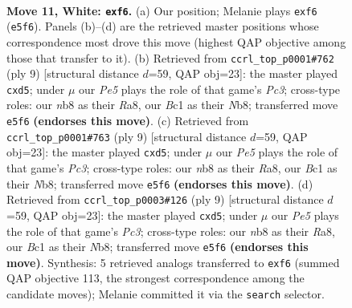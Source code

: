 \documentclass[11pt]{article}
\begin{document}
\clearpage

\begin{figure}[p]\centering
\begin{subfigure}{0.46\textwidth}\centering
\resizebox{\linewidth}{!}{%
\newchessgame
\chessboard[
  setfen={rnbqkb1r/ppp1p3/1n3pp1/3pP1Np/P2P4/NB6/1PP2PPP/R1BQ1RK1 w kq - 0 11},
  showmover=false,
  pgfstyle=straightmove, color=movearrow, markmove={e5-f6}
]}
\caption{}
\end{subfigure}\hfill
\begin{subfigure}{0.46\textwidth}\centering
\resizebox{\linewidth}{!}{%
\newchessgame
\chessboard[
  setfen={rn1qkb1r/pp2pppp/2p2n2/3P1b2/3P4/4PN2/PP3PPP/RNBQKB1R b KQkq - 0 5},
  showmover=false,
  pgfstyle=straightmove, color=movearrow, markmove={c6-d5}
]}
\caption{}
\end{subfigure}
\\[4pt]
\begin{subfigure}{0.46\textwidth}\centering
\resizebox{\linewidth}{!}{%
\newchessgame
\chessboard[
  setfen={rn1qkb1r/pp2pppp/2p2n2/3P1b2/3P4/4PN2/PP3PPP/RNBQKB1R b KQkq - 0 5},
  showmover=false,
  pgfstyle=straightmove, color=movearrow, markmove={c6-d5}
]}
\caption{}
\end{subfigure}\hfill
\begin{subfigure}{0.46\textwidth}\centering
\resizebox{\linewidth}{!}{%
\newchessgame
\chessboard[
  setfen={rn1qkb1r/pp2pppp/2p2n2/3P1b2/3P4/4PN2/PP3PPP/RNBQKB1R b KQkq - 0 5},
  showmover=false,
  pgfstyle=straightmove, color=movearrow, markmove={c6-d5}
]}
\caption{}
\end{subfigure}
\caption{\textbf{Move 11, White: \texttt{exf6}.} (a) Our position; Melanie plays \texttt{exf6} (\texttt{e5f6}). Panels (b)--(d) are the retrieved master positions whose correspondence most drove this move (highest QAP objective among those that transfer to it). (b) Retrieved from \texttt{ccrl\_top\_p0001\#762} (ply 9) [structural distance $d$=59, QAP obj=23]: the master played \texttt{cxd5}; under $\mu$ our \emph{Pe5} plays the role of that game's \emph{Pc3}; cross-type roles: our \emph{n}b8 as their \emph{R}a8, our \emph{B}c1 as their \emph{N}b8; transferred move \texttt{e5f6} \textbf{(endorses this move)}. (c) Retrieved from \texttt{ccrl\_top\_p0001\#763} (ply 9) [structural distance $d$=59, QAP obj=23]: the master played \texttt{cxd5}; under $\mu$ our \emph{Pe5} plays the role of that game's \emph{Pc3}; cross-type roles: our \emph{n}b8 as their \emph{R}a8, our \emph{B}c1 as their \emph{N}b8; transferred move \texttt{e5f6} \textbf{(endorses this move)}. (d) Retrieved from \texttt{ccrl\_top\_p0003\#126} (ply 9) [structural distance $d$=59, QAP obj=23]: the master played \texttt{cxd5}; under $\mu$ our \emph{Pe5} plays the role of that game's \emph{Pc3}; cross-type roles: our \emph{n}b8 as their \emph{R}a8, our \emph{B}c1 as their \emph{N}b8; transferred move \texttt{e5f6} \textbf{(endorses this move)}. Synthesis: 5 retrieved analogs transferred to \texttt{exf6} (summed QAP objective 113, the strongest correspondence among the candidate moves); Melanie committed it via the \texttt{search} selector.}
\label{fig:thought-m20}
\end{figure}
\end{document}

